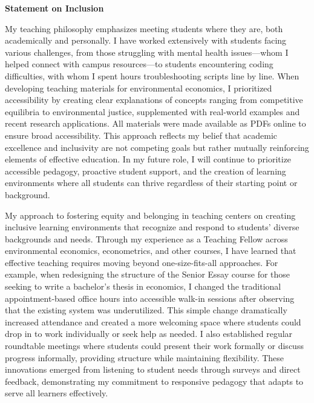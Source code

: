 \documentclass[11pt,letterpaper]{article}
\newenvironment{cvheader}
{\begin{center}\Large}
{\end{center}}
\begin{document}
\begin{cvheader}
{\Huge\textbf{Statement on Inclusion}}
\end{cvheader}

\vspace{8pt}

My teaching philosophy emphasizes meeting students where they are, both academically and personally. I have worked extensively with students facing various challenges, from those struggling with mental health issues—whom I helped connect with campus resources—to students encountering coding difficulties, with whom I spent hours troubleshooting scripts line by line. When developing teaching materials for environmental economics, I prioritized accessibility by creating clear explanations of concepts ranging from competitive equilibria to environmental justice, supplemented with real-world examples and recent research applications. All materials were made available as PDFs online to ensure broad accessibility. This approach reflects my belief that academic excellence and inclusivity are not competing goals but rather mutually reinforcing elements of effective education. In my future role, I will continue to prioritize accessible pedagogy, proactive student support, and the creation of learning environments where all students can thrive regardless of their starting point or background.

My approach to fostering equity and belonging in teaching centers on creating inclusive learning environments that recognize and respond to students' diverse backgrounds and needs. Through my experience as a Teaching Fellow across environmental economics, econometrics, and other courses, I have learned that effective teaching requires moving beyond one-size-fits-all approaches. For example, when redesigning the structure of the Senior Essay course for those seeking to write a bachelor's thesis in economics, I changed the traditional appointment-based office hours into accessible walk-in sessions after observing that the existing system was underutilized. This simple change dramatically increased attendance and created a more welcoming space where students could drop in to work individually or seek help as needed. I also established regular roundtable meetings where students could present their work formally or discuss progress informally, providing structure while maintaining flexibility. These innovations emerged from listening to student needs through surveys and direct feedback, demonstrating my commitment to responsive pedagogy that adapts to serve all learners effectively.
\end{document}
